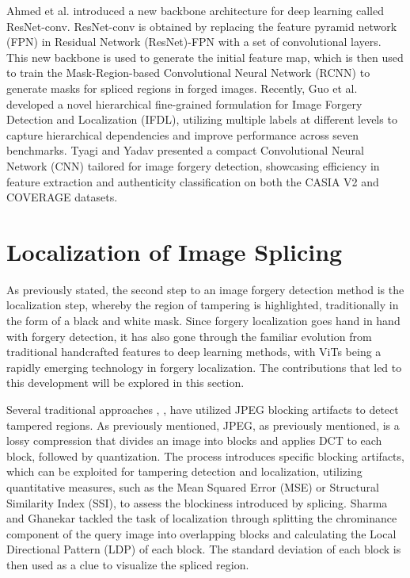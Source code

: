 Ahmed et al. \cite{ahmed2020image} introduced a new backbone architecture for deep learning called ResNet-conv. ResNet-conv is obtained by replacing the feature pyramid network (FPN) in Residual Network (ResNet)-FPN with a set of convolutional layers. This new backbone is used to generate the initial feature map, which is then used to train the Mask-Region-based Convolutional Neural Network (RCNN) to generate masks for spliced regions in forged images. Recently, Guo et al. \cite{guo2023hierarchical} developed a novel hierarchical fine-grained formulation for Image Forgery Detection and Localization (IFDL), utilizing multiple labels at different levels to capture hierarchical dependencies and improve performance across seven benchmarks. Tyagi and Yadav \cite{tyagi2023mininet} presented a compact Convolutional Neural Network (CNN) tailored for image forgery detection, showcasing efficiency in feature extraction and authenticity classification on both the CASIA V2 and COVERAGE datasets.


  \section{Localization of Image Splicing } \label{sec:s3}
  As previously stated, the second step to an image forgery detection method is the localization step, whereby the region of tampering is highlighted, traditionally in the form of a black and white mask. Since forgery localization goes hand in hand with forgery detection, it has also gone through the familiar evolution from traditional handcrafted features to deep learning methods, with ViTs being a rapidly emerging technology in forgery localization. The contributions that led to this development will be explored in this section.

Several traditional approaches \cite{bianchi2011improved}, \cite{luo2010jpeg}, \cite{lin2009fast} have utilized JPEG blocking artifacts to detect tampered regions. As previously mentioned, JPEG, as previously mentioned, is a lossy compression that divides an image into blocks and applies DCT to each block, followed by quantization. The process introduces specific blocking artifacts, which can be exploited for tampering detection and localization, utilizing quantitative measures, such as the Mean Squared Error (MSE) or Structural Similarity Index (SSI), to assess the blockiness introduced by splicing. Sharma and Ghanekar \cite{Sharma2019} tackled the task of localization through splitting the chrominance component of the query image into overlapping blocks and calculating the Local Directional Pattern (LDP) of each block. The standard deviation of each block is then used as a clue to visualize the spliced region.

